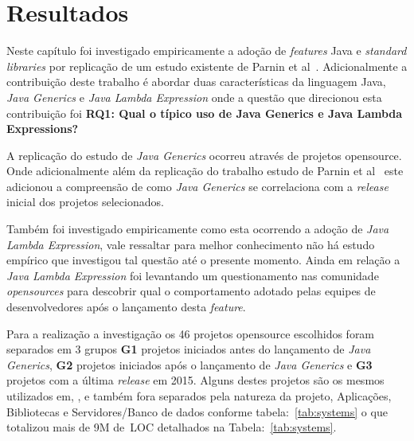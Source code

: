 \chapter{Resultados}
Neste capítulo foi investigado empiricamente a adoção de \textit{features} Java e \textit{standard libraries} por replicação de um estudo existente de Parnin et al~\cite{Parnin:ACM2011}. Adicionalmente a contribuição deste trabalho é abordar duas características da linguagem Java, \textit{Java Generics} e \textit{Java Lambda Expression} onde a questão que direcionou esta contribuição foi \textbf{RQ1: Qual o típico uso de Java Generics e Java Lambda Expressions?}
 

A replicação do estudo de \textit{Java Generics} ocorreu através de projetos opensource. Onde adicionalmente além da replicação do trabalho estudo de Parnin et al~\cite{Parnin:ACM2011} este adicionou a compreensão de como \textit{Java Generics} se correlaciona com a \textit{release} inicial dos projetos selecionados. 

Também foi investigado empiricamente como esta ocorrendo a adoção de \textit{Java Lambda Expression}, vale ressaltar para melhor conhecimento não há estudo empírico que investigou tal questão até o presente momento.
Ainda em relação a \textit{Java Lambda Expression} foi levantando um questionamento nas comunidade \textit{opensources} para descobrir qual o comportamento adotado pelas equipes de desenvolvedores após o lançamento desta \textit{feature}. 

Para a realização a investigação os 46 projetos opensource escolhidos foram separados em 3 grupos \textbf{G1} projetos iniciados antes do lançamento de \textit{Java Generics}, \textbf{G2} projetos iniciados após o lançamento de \textit{Java Generics} e \textbf{G3} projetos com a última \textit{release} em 2015. Alguns destes projetos são os mesmos utilizados em, \cite{Parnin:ACM2011, Dyer:ACM2014, ward2015performance}, e também fora separados pela natureza da projeto,  Aplicações, Bibliotecas e Servidores/Banco de dados conforme tabela:~\ref{tab:systems} o que totalizou mais de 9M de~\acs{LOC} detalhados na Tabela:~\ref*{tab:systems}.

